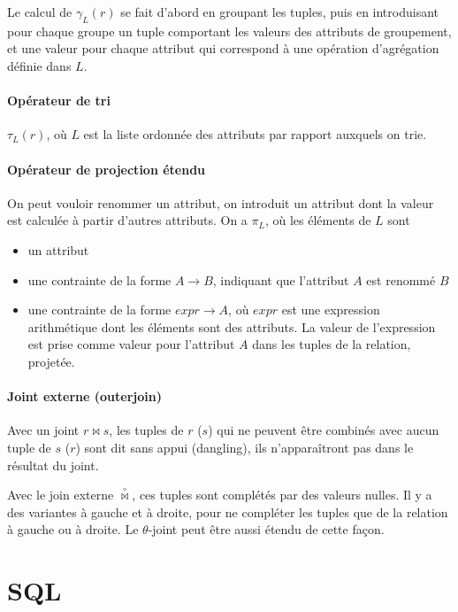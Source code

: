 	 Le calcul de $\gamma_L(r)$ se fait d'abord en groupant les tuples, puis en introduisant pour chaque groupe un tuple comportant les valeurs des attributs de groupement, et une valeur pour chaque attribut qui correspond à une opération d'agrégation définie dans $L$.
	 
	 
	 \paragraph{Opérateur de tri} $\tau_L(r)$, où $L$ est la liste ordonnée des attributs par rapport auxquels on trie.
	 
	 
	\paragraph{Opérateur de projection étendu} On peut vouloir renommer un attribut, on introduit un attribut dont la valeur est calculée à partir d'autres attributs. On a $\pi_L$, où les éléments de $L$ sont
	
	\begin{itemize}
		\item un attribut
		\item une contrainte de la forme $A \rightarrow B$, indiquant que l'attribut $A$ est renommé $B$
		\item une contrainte de la forme $expr \rightarrow A$, où $expr$ est une expression arithmétique dont les éléments sont des attributs. La valeur de l'expression est prise comme valeur pour l'attribut $A$ dans les tuples de la relation, projetée.
	\end{itemize}


	\paragraph{Joint externe (outerjoin)} Avec un joint $r \Join s$, les tuples de $r$ ($s$) qui ne peuvent être combinés avec aucun tuple de $s$ ($r$) sont dit sans appui (dangling), ils n'apparaîtront pas dans le résultat du joint.
	
	Avec le join externe $\overset{\circ}{\Join}$, ces tuples sont complétés par des valeurs nulles. Il y a des variantes à gauche et à droite, pour ne compléter les tuples que de la relation à gauche ou à droite. Le $\theta$-joint peut être aussi étendu de cette façon.
	
		 	 
	 \section{SQL}
	 
